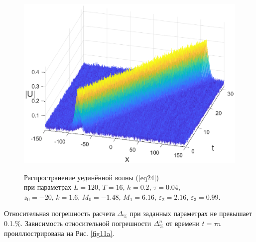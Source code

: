 \documentclass[14pt,a4paper]{extreport}
\begin{document}
			\begin{figure}[H]
				\begin{center}
					\begin{minipage}[h]{0.48\linewidth} %
						\includegraphics[width=1\linewidth]{fig11.eps}
						\label{fig10a}
					\end{minipage}
					\hfill
					\begin{minipage}[h]{0.48\linewidth}
						\label{fig10b}
					\end{minipage}
				\end{center}
				\caption{Распространение уединённой волны (\ref{eq24}) \\
				при параметрах
				\(L=120,\, T=16,\, h=0.2,\, \tau=0.04\), 
				\(z_{0}=-20,\,k=1.6,\, M_{0}=-1.48,\, M_{1}=6.16,\,\varepsilon_{2}=2.16,\,\varepsilon_{3}=0.99\).}
				\label{fig10}
			\end{figure}
			Относительная погрешность расчета \(\Delta_{\%}\) при заданных параметрах не превышает 0.1.\%. Зависимость относительной погрешности \(\Delta_{\%}^{n}\) от времени \(t=\tau n\) проиллюстрирована на Рис. \ref{fig11a}.
\end{document}

